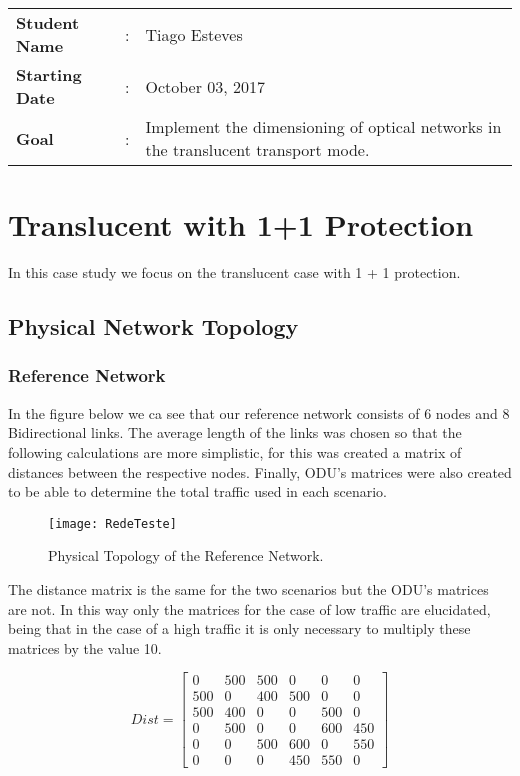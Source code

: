 \clearpage

\begin{tcolorbox}	
\begin{tabular}{p{2.75cm} p{0.2cm} p{10.5cm}} 	
\textbf{Student Name}  &:& Tiago Esteves\\
\textbf{Starting Date} &:& October 03, 2017\\
\textbf{Goal}          &:& Implement the dimensioning of optical networks in the translucent transport mode.
\end{tabular}
\end{tcolorbox}

\section{Translucent with 1+1 Protection}
In this case study we focus on the translucent case with 1 + 1 protection.


\subsection{Physical Network Topology}

\subsubsection{Reference Network}
In the figure below we ca see that our reference network consists of 6 nodes and 8 Bidirectional links.
The average length of the links was chosen so that the following calculations are more simplistic, for this was created a matrix of distances between the respective nodes.
Finally, ODU's matrices were also created to be able to determine the total traffic used in each scenario.

\begin{figure}[h!]
\centering
\texttt{[image: RedeTeste]}
\caption{Physical Topology of the Reference Network.}
\end{figure}

The distance matrix is the same for the two scenarios but the ODU's matrices are not.
In this way only the matrices for the case of low traffic are elucidated, being that in the case of a high traffic it is only necessary to multiply these matrices by the value 10.

\[
Dist=
  \begin{bmatrix}
    0 & 500 & 500 & 0 & 0 & 0 \\
    500 & 0 & 400 & 500 & 0 & 0 \\
    500 & 400 & 0 & 0 & 500 & 0 \\
    0 & 500 & 0 & 0 & 600 & 450 \\
    0 & 0 & 500 & 600 & 0 & 550 \\
    0 & 0 & 0 & 450 & 550 & 0
  \end{bmatrix}
\]

